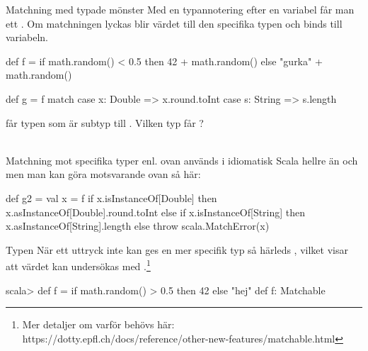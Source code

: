 \begin{Slide}{Matchning med typade mönster}\SlideFontSmall
Med en typannotering efter en variabel får man ett  . Om matchningen lyckas blir värdet  till den specifika typen och binds till variabeln.
\begin{Code}
def f = 
  if math.random() < 0.5 then 42 + math.random() 
  else "gurka" + math.random()

def g = f match 
  case x: Double => x.round.toInt
  case s: String => s.length
\end{Code}
 får typen  som är subtyp till . Vilken typ får ? \pause ~~
{\SlideFontTiny \\\vspace{0.5em} Matchning mot specifika typer enl. ovan används i idiomatisk Scala hellre än  och  men man kan göra motsvarande ovan så här:
\begin{Code}
def g2 =  
  val x = f
  if x.isInstanceOf[Double] then x.asInstanceOf[Double].round.toInt
  else if x.isInstanceOf[String] then x.asInstanceOf[String].length
  else throw scala.MatchError(x)
\end{Code}
}
\end{Slide}

\begin{Slide}{Typen }
När ett uttryck inte kan ges en mer specifik typ så härleds , vilket visar att värdet kan undersökas med .\footnote{Mer detaljer om varför  behövs här: https://dotty.epfl.ch/docs/reference/other-new-features/matchable.html}
\begin{REPLnonum}
scala> def f = if math.random() > 0.5 then 42 else "hej"
def f: Matchable
\end{REPLnonum}
\end{Slide}

